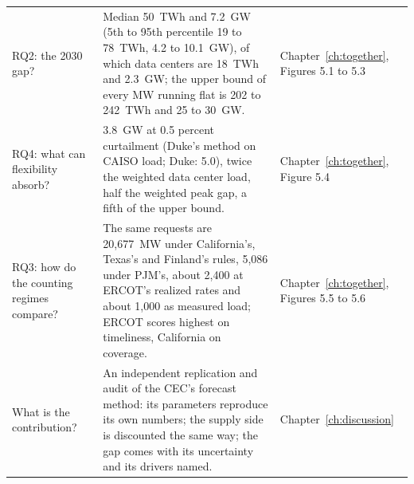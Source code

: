 \begin{table}[H]
\begin{tabular}{p{4.0cm}p{8.4cm}p{2.6cm}}
RQ2: the 2030 gap? & Median 50~TWh and 7.2~GW (5th to 95th percentile 19 to 78~TWh, 4.2 to 10.1~GW), of which data centers are 18~TWh and 2.3~GW; the upper bound of every MW running flat is 202 to 242~TWh and 25 to 30~GW. & Chapter~\ref{ch:together}, Figures 5.1 to 5.3 \\
RQ4: what can flexibility absorb? & 3.8~GW at 0.5 percent curtailment (Duke's method on CAISO load; Duke: 5.0), twice the weighted data center load, half the weighted peak gap, a fifth of the upper bound. & Chapter~\ref{ch:together}, Figure 5.4 \\
RQ3: how do the counting regimes compare? & The same requests are 20,677~MW under California's, Texas's and Finland's rules, 5,086 under PJM's, about 2,400 at ERCOT's realized rates and about 1,000 as measured load; ERCOT scores highest on timeliness, California on coverage. & Chapter~\ref{ch:together}, Figures 5.5 to 5.6 \\
What is the contribution? & An independent replication and audit of the CEC's forecast method: its parameters reproduce its own numbers; the supply side is discounted the same way; the gap comes with its uncertainty and its drivers named. & Chapter~\ref{ch:discussion} \\
\bottomrule
\end{tabular}
\end{table}

